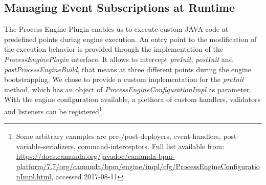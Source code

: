 


\subsection{Managing Event Subscriptions at Runtime}
The Process Engine Plugin enables us to execute custom JAVA code at predefined points during engine execution.
An entry point to the modification of the execution behavior is provided through the implementation of the \textit{ProcessEnginePlugin} interface. It allows to intercept \textit{preInit}, \textit{postInit} and \textit{postProcessEngineBuild}, that means at three different points during the engine bootstrapping.
We chose to provide a custom implementation for the \textit{preInit} method, which has an object of \textit{ProcessEngineConfigurationImpl} as parameter.
With the engine configuration available, a plethora of custom handlers, validators and listeners can be registered\footnote{Some arbitrary examples are pre-/post-deployers, event-handlers, post-variable-serializers, command-interceptors. Full list available from: \url{https://docs.camunda.org/javadoc/camunda-bpm-platform/7.7/org/camunda/bpm/engine/impl/cfg/ProcessEngineConfigurationImpl.html}, accessed 2017-08-11}.

